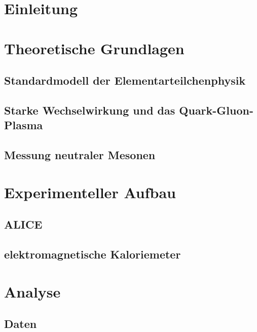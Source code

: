 \documentclass[11pt]{article}
\author{Marvin Hemmer}
\begin{document}
\begin{titlepage}
\begin{center}

\end{center}
\end{titlepage}
\newpage
\tableofcontents
\newpage

\section*{Einleitung}

\section{Theoretische Grundlagen} \label{s1}
\subsection{Standardmodell der Elementarteilchenphysik} \label{s1s1}

\subsection{Starke Wechselwirkung und das Quark-Gluon-Plasma} \label{s1s2}

\subsection{Messung neutraler Mesonen} \label{s1s3}

\section{Experimenteller Aufbau} \label{s2}
\subsection{ALICE} \label{s2s1}
\subsection{elektromagnetische Kaloriemeter} \label{s2s2}

\section{Analyse} \label{s3}

\subsection{Daten} \label{s3s1}
\end{document}
